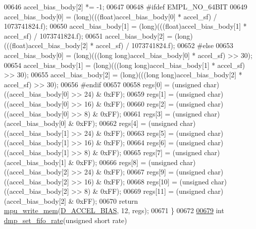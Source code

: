 \begin{DoxyCode}
00646         accel\_bias\_body[2] *= -1;
00647 
00648 \textcolor{preprocessor}{#ifdef EMPL\_NO\_64BIT}
00649     accel\_bias\_body[0] = (long)(((\textcolor{keywordtype}{float})accel\_bias\_body[0] * accel\_sf) / 1073741824.f);
00650     accel\_bias\_body[1] = (long)(((\textcolor{keywordtype}{float})accel\_bias\_body[1] * accel\_sf) / 1073741824.f);
00651     accel\_bias\_body[2] = (long)(((\textcolor{keywordtype}{float})accel\_bias\_body[2] * accel\_sf) / 1073741824.f);
00652 \textcolor{preprocessor}{#else}
00653     accel\_bias\_body[0] = (long)(((\textcolor{keywordtype}{long} \textcolor{keywordtype}{long})accel\_bias\_body[0] * accel\_sf) >> 30);
00654     accel\_bias\_body[1] = (long)(((\textcolor{keywordtype}{long} \textcolor{keywordtype}{long})accel\_bias\_body[1] * accel\_sf) >> 30);
00655     accel\_bias\_body[2] = (long)(((\textcolor{keywordtype}{long} \textcolor{keywordtype}{long})accel\_bias\_body[2] * accel\_sf) >> 30);
00656 \textcolor{preprocessor}{#endif}
00657 
00658     regs[0] = (\textcolor{keywordtype}{unsigned} char)((accel\_bias\_body[0] >> 24) & 0xFF);
00659     regs[1] = (\textcolor{keywordtype}{unsigned} char)((accel\_bias\_body[0] >> 16) & 0xFF);
00660     regs[2] = (\textcolor{keywordtype}{unsigned} char)((accel\_bias\_body[0] >> 8) & 0xFF);
00661     regs[3] = (\textcolor{keywordtype}{unsigned} char)(accel\_bias\_body[0] & 0xFF);
00662     regs[4] = (\textcolor{keywordtype}{unsigned} char)((accel\_bias\_body[1] >> 24) & 0xFF);
00663     regs[5] = (\textcolor{keywordtype}{unsigned} char)((accel\_bias\_body[1] >> 16) & 0xFF);
00664     regs[6] = (\textcolor{keywordtype}{unsigned} char)((accel\_bias\_body[1] >> 8) & 0xFF);
00665     regs[7] = (\textcolor{keywordtype}{unsigned} char)(accel\_bias\_body[1] & 0xFF);
00666     regs[8] = (\textcolor{keywordtype}{unsigned} char)((accel\_bias\_body[2] >> 24) & 0xFF);
00667     regs[9] = (\textcolor{keywordtype}{unsigned} char)((accel\_bias\_body[2] >> 16) & 0xFF);
00668     regs[10] = (\textcolor{keywordtype}{unsigned} char)((accel\_bias\_body[2] >> 8) & 0xFF);
00669     regs[11] = (\textcolor{keywordtype}{unsigned} char)(accel\_bias\_body[2] & 0xFF);
00670     \textcolor{keywordflow}{return} \hyperlink{group___d_r_i_v_e_r_s_gafea59910bc3dd30ba3356b1c75213a5f}{mpu\_write\_mem}(\hyperlink{group___d_r_i_v_e_r_s_ga2cc522b8f621f32418257ab61144a744}{D\_ACCEL\_BIAS}, 12, regs);
00671 \}
00672 
\hypertarget{inv__mpu__dmp__motion__driver_8c_source.tex_l00679}{}\hyperlink{group___d_r_i_v_e_r_s_ga5399728fd572a7694af20286cc9d4121}{00679} \textcolor{keywordtype}{int} \hyperlink{group___d_r_i_v_e_r_s_ga5399728fd572a7694af20286cc9d4121}{dmp\_set\_fifo\_rate}(\textcolor{keywordtype}{unsigned} \textcolor{keywordtype}{short} rate)

\end{DoxyCode}
